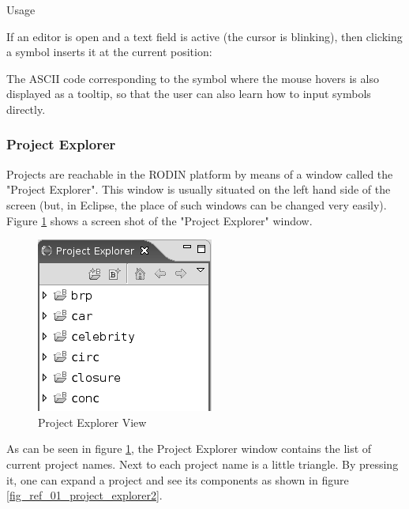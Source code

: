 Usage

If an editor is open and a text field is active (the cursor is blinking), then clicking a symbol inserts it at the current position: 

The ASCII code corresponding to the symbol where the mouse hovers is also displayed as a tooltip, so that the user can also learn how to input symbols directly. 


\subsubsection{Project Explorer}
\label{reference_01_the_project_explorer}


Projects are reachable in the RODIN platform by means of a window called the "Project Explorer". This window is usually situated on the left hand side of the screen (but, in Eclipse, the place of such windows can be changed very easily). Figure \ref{fig_ref_01_project_explorer1} shows a screen shot of the "Project Explorer" window.

\begin{figure}[!h]
\begin{center}
	\includegraphics{img/reference/ref_01_project_explorer1.png}
	\caption{Project Explorer View}
	\label{fig_ref_01_project_explorer1}
\end{center}
\end{figure}

As can be seen in figure \ref{fig_ref_01_project_explorer1}, the Project Explorer window contains the list of current project names. Next to each project name is a little triangle. By pressing it, one can expand a project and see its components as shown in figure \ref{fig_ref_01_project_explorer2}. 

